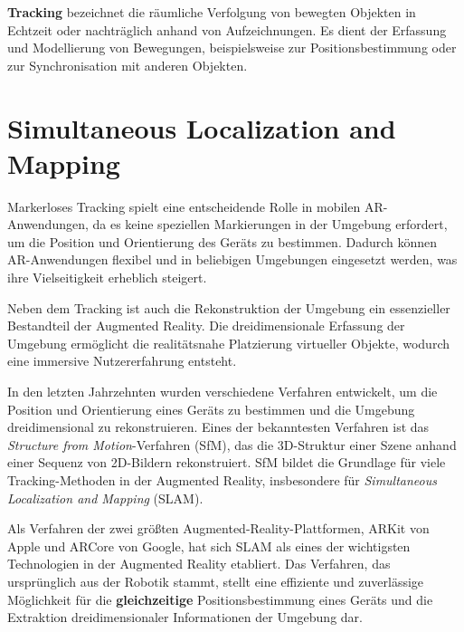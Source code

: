 \begin{tcolorbox}[colback=THAi-Blue!20!white, colframe=THAi-Blue]
    \textbf{Tracking} bezeichnet die räumliche Verfolgung von bewegten Objekten in Echtzeit oder nachträglich anhand von Aufzeichnungen. Es dient der Erfassung und Modellierung von Bewegungen, beispielsweise zur Positionsbestimmung oder zur Synchronisation mit anderen Objekten. \cite{wikipedia2024tracking}
\end{tcolorbox}  

\section{Simultaneous Localization and Mapping}\label{SLAM}

Markerloses Tracking spielt eine entscheidende Rolle in mobilen AR-Anwendungen, da es keine speziellen Markierungen in der Umgebung erfordert, um die Position und Orientierung des Geräts zu bestimmen. Dadurch können AR-Anwendungen flexibel und in beliebigen Umgebungen eingesetzt werden, was ihre Vielseitigkeit erheblich steigert. \cite{doerner2022virtual}

Neben dem Tracking ist auch die Rekonstruktion der Umgebung ein essenzieller Bestandteil der Augmented Reality. Die dreidimensionale Erfassung der Umgebung ermöglicht die realitätsnahe Platzierung virtueller Objekte, wodurch eine immersive Nutzererfahrung entsteht. \cite{doerner2022virtual}

In den letzten Jahrzehnten wurden verschiedene Verfahren entwickelt, um die Position und Orientierung eines Geräts zu bestimmen und die Umgebung dreidimensional zu rekonstruieren. Eines der bekanntesten Verfahren ist das \emph{Structure from Motion}-Verfahren (SfM), das die 3D-Struktur einer Szene anhand einer Sequenz von 2D-Bildern rekonstruiert. SfM bildet die Grundlage für viele Tracking-Methoden in der Augmented Reality, insbesondere für \emph{Simultaneous Localization and Mapping} (SLAM). \cite{doerner2022virtual, tourani2022vSLAMTrends}

Als Verfahren der zwei größten Augmented-Reality-Plattformen, ARKit von Apple und ARCore von Google, hat sich SLAM als eines der wichtigsten Technologien in der Augmented Reality etabliert. Das Verfahren, das ursprünglich aus der Robotik stammt, stellt eine effiziente und zuverlässige Möglichkeit für die \textbf{gleichzeitige} Positionsbestimmung  eines Geräts und die Extraktion dreidimensionaler Informationen der Umgebung dar. \cite{appledevdoc,arcoredevdoc, doerner2022virtual}

